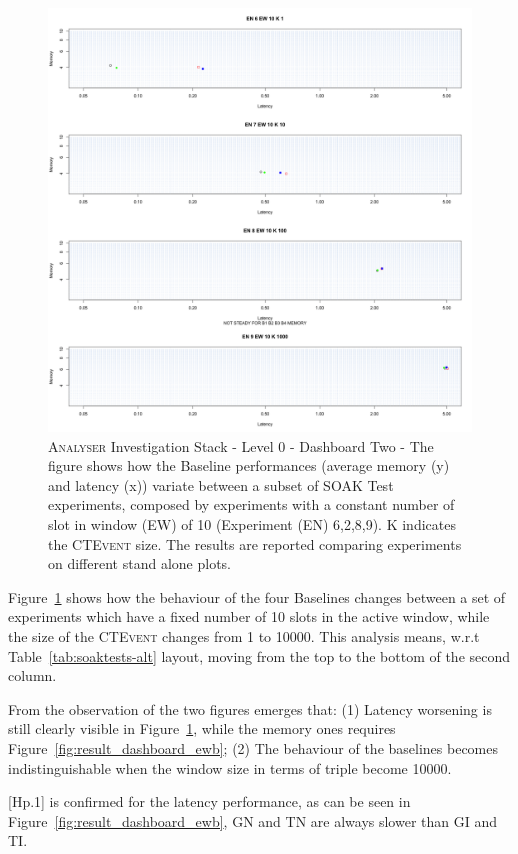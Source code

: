 \begin{figure}[h|tbp]
	\centering
	\includegraphics[width=0.80\linewidth]{images/dashboard-2-split}	
	\caption[\textsc{Analyser} Investigation Stack - Level 0 - Dashboard Two - Split Version]{\textsc{Analyser} Investigation Stack - Level 0 - Dashboard Two - The figure shows how the Baseline performances (average memory (y) and latency (x))  variate between a subset of SOAK Test experiments, composed by experiments with a constant number of slot in window (EW) of 10 (Experiment (EN) 6,2,8,9). K indicates the \textsc{CTEvent} size. The results are reported comparing experiments on different stand alone plots.}
	\label{fig:result_dashboard_ewa}
\end{figure}

Figure~\ref{fig:result_dashboard_ewa} shows how the behaviour of the four Baselines changes between a set of experiments which have a fixed number of 10 slots in the active window, while the size of the \textsc{CTEvent} changes from 1 to 10000. This analysis means, w.r.t Table~\ref{tab:soaktests-alt} layout, moving from the top to the bottom of the second column.

From the observation of the two figures emerges that: (1) Latency worsening is still clearly visible in Figure~\ref{fig:result_dashboard_ewa}, while the memory ones requires Figure~\ref{fig:result_dashboard_ewb}; (2) The behaviour of the baselines becomes indistinguishable when the window size in terms of triple become 10000. 

[Hp.1] is confirmed for the latency performance, as can be seen in Figure~\ref{fig:result_dashboard_ewb}, GN and TN are always slower than GI and TI. 

